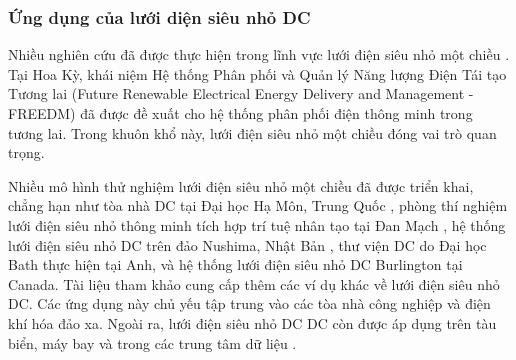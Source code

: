 \subsubsection{Ứng dụng của lưới diện siêu nhỏ DC}
Nhiều nghiên cứu đã được thực hiện trong lĩnh vực lưới điện siêu nhỏ một chiều \cite{marnay2015microgrid}. Tại Hoa Kỳ, khái niệm Hệ thống Phân phối và Quản lý Năng lượng Điện Tái tạo Tương lai (Future Renewable Electrical Energy Delivery and Management - FREEDM) \cite{huang2010future}\cite{huang2010freedm}\cite{heydt2010future} đã được đề xuất cho hệ thống phân phối điện thông minh trong tương lai. Trong khuôn khổ này, lưới điện siêu nhỏ một chiều đóng vai trò quan trọng. \par
Nhiều mô hình thử nghiệm lưới điện siêu nhỏ một chiều đã được triển khai, chẳng hạn như tòa nhà DC tại Đại học Hạ Môn, Trung Quốc \cite{zhang2015advantages}, phòng thí nghiệm lưới điện siêu nhỏ thông minh tích hợp trí tuệ nhân tạo tại Đan Mạch \cite{diaz2015intelligent}, hệ thống lưới điện siêu nhỏ DC trên đảo Nushima, Nhật Bản \cite{cho2019demonstration}, thư viện DC do Đại học Bath thực hiện tại Anh, và hệ thống lưới điện siêu nhỏ DC Burlington tại Canada. Tài liệu tham khảo \cite{marnay2015microgrid} cung cấp thêm các ví dụ khác về lưới điện siêu nhỏ DC. Các ứng dụng này chủ yếu tập trung vào các tòa nhà công nghiệp và điện khí hóa đảo xa. Ngoài ra, lưới điện siêu nhỏ DC DC còn được áp dụng trên tàu biển, máy bay và trong các trung tâm dữ liệu \cite{gharehpetian2021microgrids}. \par
